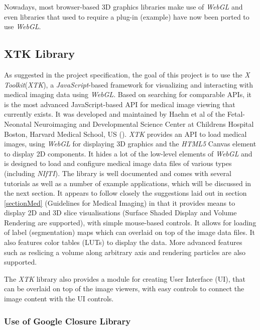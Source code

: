 \documentclass[a4paper,11pt,twoside]{article}
\begin{document}
Nowadays, most browser-based 3D graphics libraries make use of \textit{WebGL} and even libraries that used to require a plug-in (example) have now been ported to use \textit{WebGL}. 



\subsection{XTK Library}


As suggested in the project specification, the goal of this project is to use the \textit{X Toolkit}(\textit{XTK}), a \textit{JavaScript}-based framework for visualizing and interacting with medical imaging data using \textit{WebGL}. Based on searching for comparable APIs, it is the most advanced JavaScript-based API for medical image viewing that currently exists. It was developed and maintained by Haehn et al of the Fetal-Neonatal Neuroimaging and Developmental Science Center at Childrens Hospital Boston, Harvard Medical School, US (\cite{xtk}). \textit{XTK} provides an API to load medical images, using \textit{WebGL} for displaying 3D graphics and the \textit{HTML5} Canvas element to display 2D components. It hides a lot of the low-level elements of \textit{WebGL} and is designed to load and configure medical image data files of various types (including \textit{NIfTI}). The library is well documented and comes with several tutorials as well as a number of example applications, which will be discussed in the next section. It appears to follow closely the suggestions laid out in section \ref{sectionMed} (Guidelines for Medical Imaging) in that it provides means to display 2D and 3D slice visualisations (Surface Shaded Display and Volume Rendering are supported), with simple mouse-based controls. It allows for loading of label (segmentation) maps which can overlaid on top of the image data files. It also features color tables (LUTs) to display the data. More advanced features such as reslicing a volume along arbitrary axis and rendering particles are also supported. 

The \textit{XTK} library also provides a module for creating User Interface (UI), that can be overlaid on top of the image viewers, with easy controls to connect the image content with the UI controls.


\subsubsection{Use of Google Closure Library}
\end{document}
